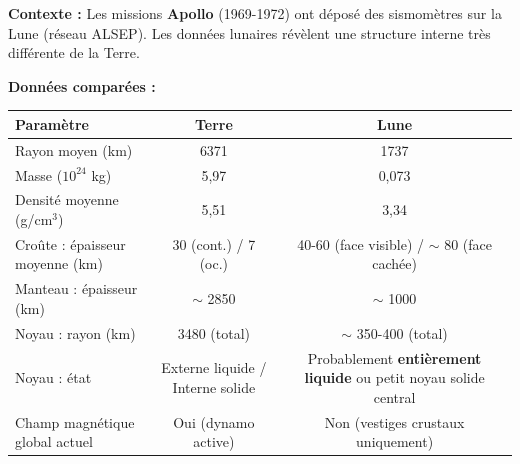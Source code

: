 \documentclass[11pt]{article}
\begin{document}
\begin{exercice}
\textbf{Contexte :} Les missions \textbf{Apollo} (1969-1972) ont déposé des sismomètres sur la Lune (réseau ALSEP). Les données lunaires révèlent une structure interne très différente de la Terre.

\textbf{Données comparées :}
\begin{center}
\begin{tabular}{|l|c|c|}\hline
Paramètre & Terre & Lune \\ \hline
Rayon moyen (km) & 6371 & 1737 \\
Masse ($10^{24}$ kg) & 5,97 & 0,073 \\
Densité moyenne (g/cm$^3$) & 5,51 & 3,34 \\
Croûte : épaisseur moyenne (km) & 30 (cont.) / 7 (oc.) & 40-60 (face visible) / $\sim$ 80 (face cachée) \\
Manteau : épaisseur (km) & $\sim$ 2850 & $\sim$ 1000 \\
Noyau : rayon (km) & 3480 (total) & $\sim$ 350-400 (total) \\
Noyau : état & Externe liquide / Interne solide & Probablement \textbf{entièrement liquide} ou petit noyau solide central \\
Champ magnétique global actuel & Oui (dynamo active) & Non (vestiges crustaux uniquement) \\ \hline
\end{tabular}
\end{center}


\end{exercice}
\end{document}
